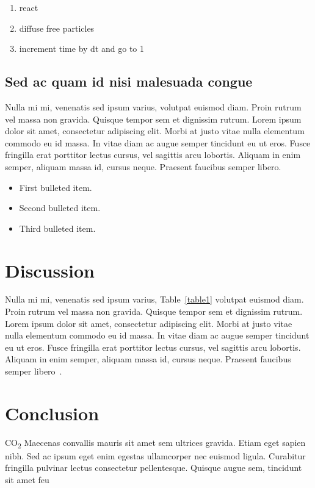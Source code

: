 \documentclass[10pt,letterpaper]{article}
\begin{document}
\begin{enumerate}
	\item{react}
	\item{diffuse free particles}
	\item{increment time by dt and go to 1}
\end{enumerate}


\subsection*{Sed ac quam id nisi malesuada congue}

Nulla mi mi, venenatis sed ipsum varius, volutpat euismod diam. Proin rutrum vel massa non gravida. Quisque tempor sem et dignissim rutrum. Lorem ipsum dolor sit amet, consectetur adipiscing elit. Morbi at justo vitae nulla elementum commodo eu id massa. In vitae diam ac augue semper tincidunt eu ut eros. Fusce fringilla erat porttitor lectus cursus, vel sagittis arcu lobortis. Aliquam in enim semper, aliquam massa id, cursus neque. Praesent faucibus semper libero.

\begin{itemize}
	\item First bulleted item.
	\item Second bulleted item.
	\item Third bulleted item.
\end{itemize}

\section*{Discussion}
Nulla mi mi, venenatis sed ipsum varius, Table~\ref{table1} volutpat euismod diam. Proin rutrum vel massa non gravida. Quisque tempor sem et dignissim rutrum. Lorem ipsum dolor sit amet, consectetur adipiscing elit. Morbi at justo vitae nulla elementum commodo eu id massa. In vitae diam ac augue semper tincidunt eu ut eros. Fusce fringilla erat porttitor lectus cursus, vel sagittis arcu lobortis. Aliquam in enim semper, aliquam massa id, cursus neque. Praesent faucibus semper libero~\cite{bib3}.

\section*{Conclusion}

CO\textsubscript{2} Maecenas convallis mauris sit amet sem ultrices gravida. Etiam eget sapien nibh. Sed ac ipsum eget enim egestas ullamcorper nec euismod ligula. Curabitur fringilla pulvinar lectus consectetur pellentesque. Quisque augue sem, tincidunt sit amet feu
\end{document}
